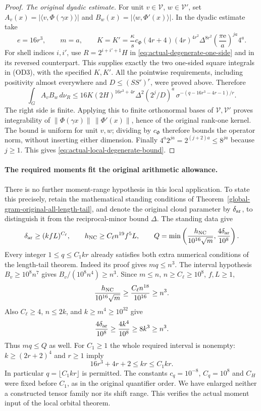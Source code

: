 \begin{proof}
\emph{The original dyadic estimate.}
For unit $v\in\mathcal V$, $w\in\mathcal V'$, set
$A_v(x)=|\langle v,\Phi(\gamma x)\rangle|$ and
$B_w(x)=|\langle w,\Phi'(x)\rangle|$.
In the dyadic estimate take
\[
 e=16r^3,\qquad m=a,\qquad
 K=K'=\frac{\kappa}{s}c_\Phi(4r+4)(4r)^{4r^2}\Delta^{8r^2}
                 \left(\frac{\pi\mathrm e}{a}\right)^{ja}4^a.
\]
For shell indices $i,i'$, use $R=2^{i+i'+1}H$ in
\eqref{eq:actual-degenerate-one-side} and in its reversed
counterpart.  This supplies exactly the two one-sided square
integrals in (OD3), with the specified $K,K'$.
All the pointwise requirements, including positivity almost
everywhere and $D\le(SS')^r$, were proved above.
Therefore
\[
 \int_G A_vB_w\,d\nu_R
 \le16K(2H)^{16r^3+4r}\Delta^2
       (2^j/D)^a\,\sigma^{-(q-16r^3-4r-1)/r}.
\]
The right side is finite.  Applying this to finite orthonormal
bases of $\mathcal V,\mathcal V'$ proves integrability of
$\|\Phi(\gamma x)\|\,\|\Phi'(x)\|$, hence of the original
rank-one kernel.  The bound is uniform for unit $v,w$;
dividing by $c_\Phi$ therefore bounds the operator norm,
without inserting either dimension.  Finally
$4^a2^{ja}=2^{(j+2)a}\le8^{ja}$ because $j\ge1$.
This gives \eqref{eq:actual-local-degenerate-bound}.
\end{proof}

\paragraph{The required moments fit the original arithmetic allowance.}
There is no further moment-range hypothesis in this local
application.  To state this precisely, retain the mathematical
standing conditions of
Theorem~\ref{global-gram-original-all-length-tail}, and denote
the original cloud parameter by $\delta_{\rm ar}$, to
distinguish it from the reciprocal-minor bound $\Delta$.
The standing data give
\[
 \delta_{\rm ar}\ge(kfL)^{C_\ell},\qquad
 h_{\rm NC}\ge C_\ell n^{19}f^5L,\qquad
 Q=\min\left(\frac{h_{\rm NC}}{10^{16}\sqrt m},
                                  \frac{4\delta_{\rm ar}}{10^8}\right).
\]
Every integer $1\le q\le C_1kr$ already satisfies both
extra numerical conditions of the length-tail theorem.
Indeed its proof gives $mq\le n^3$.
The interval hypothesis $B_v\ge10^8n^7$ gives
$B_v/(10^8n^4)\ge n^3$.
Since $m\le n$, $n\ge C_\ell\ge10^8$, $f,L\ge1$,
\[
 \frac{h_{\rm NC}}{10^{16}\sqrt m}
       \ge\frac{C_\ell n^{18}}{10^{16}}\ge n^3.
\]
Also $C_\ell\ge4$, $n\le2k$, and
$k\ge m^4\ge10^{32}$ give
\[
 \frac{4\delta_{\rm ar}}{10^8}
       \ge\frac{4k^4}{10^8}\ge8k^3\ge n^3.
\]
Thus $mq\le Q$ as well.  For $C_1\ge1$ the whole required
interval is nonempty: $k\ge(2r+2)^4$ and $r\ge1$ imply
\[
             16r^3+4r+2\le kr\le C_1kr.
\]
In particular $q=\lfloor C_1kr\rfloor$ is permitted.
The constants $c_q=10^{-8}$, $C_q=10^8$ and $C_H$ were
fixed before $C_1$, as in the original quantifier order.
We have enlarged neither a constructed tensor family nor
its shift range.  This verifies the actual moment input of
the local orbital theorem.

